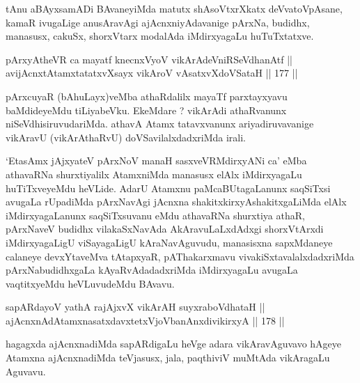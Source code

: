 \begin{artha}
tAnu aBAyxsamADi BAvaneyiMda matutx shAsoVtxrXkatx deVvatoVpAsane,
kamaR ivugaLige anusAravAgi ajAcnxniyAdavanige pArxNa, budidhx,
manasusx, cakuSx, shorxVtarx modalAda iMdirxyagaLu huTuTxtatxve.
\end{artha}


\begin{shl}
pArxyAtheVR ca mayatf knecnxVyoV vikArAdeVniRSeVdhanAtf || \\
avijAcnxtAtamxtatatxvXsayx vikAroV vA\s satxvXdoVSataH \hfill || 177 ||  
\end{shl}

\begin{artha}
pArxcuyaR (bAhuLayx)veMba athaRdalilx mayaTf parxtayxyavu
baMdideyeMdu tiLiyabeVku. EkeMdare ? vikArAdi athaRvanunx
niSeVdhisiruvudariMda. athavA Atamx tatavxvanunx ariyadiruvavanige
vikAravU (vikArAthaRvU) doVSavilalxdadxriMda irali.
\end{artha}

\begin{artha}
`EtasAmx jAjxyateV pArxNoV manaH sasxveVRMdirxyANi ca' eMba athavaRNa shurxtiyalilx AtamxniMda manasusx elAlx
iMdirxyagaLu huTiTxveyeMdu heVLide. AdarU Atamxnu paMcaBUtagaLanunx
saqSiTxsi avugaLa rUpadiMda pArxNavAgi jAcnxna
shakitxkirxyAshakitxgaLiMda elAlx iMdirxyagaLanunx saqSiTxsuvanu
eMdu athavaRNa shurxtiya athaR, pArxNaveV budidhx vilakaSxNavAda
AkAravuLaLxdAdxgi shorxVtArxdi iMdirxyagaLigU viSayagaLigU
kAraNavAguvudu, manasisxna sapxMdaneye calaneye devxYtaveMva
tAtapxyaR, pAThakarxmavu vivakiSxtavalalxdadxriMda pArxNabudidhxgaLa
kAyaRvAdadadxriMda iMdirxyagaLu avugaLa vaqtitxyeMdu heVLuvudeMdu
BAvavu.
\end{artha}

\begin{shl}
sapARdayoV yathA rajAjxvX vikArAH suyxraboVdhataH || \\
ajAcnxnAdAtamxnasatxdavxtetxVjoVbanAnxdivikirxyA \hfill || 178 ||  
\end{shl}

\begin{artha}
hagagxda ajAcnxnadiMda sapARdigaLu heVge adara vikAravAguvavo hAgeye
Atamxna ajAcnxnadiMda teVjasusx, jala, paqthiviV muMtAda vikAragaLu
Aguvavu.
\end{artha}


